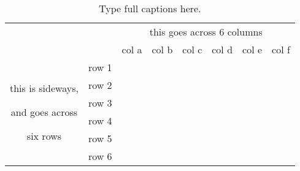 \begin{table}[h!tb]

\centering

\begin{tabular}{cc|rrrrrr}\hline

&&\multicolumn{6}{c}{this goes across 6 columns}\\

 && col a & col b & col c & col d & col e & col f \\ \hline \hline

\multirow{6}{*}{
%
\begin{sideways}
this is sideways,
\end{sideways}
%
\begin{sideways}
and goes across
\end{sideways}
%
\begin{sideways}
six rows
\end{sideways}
%
}

& row 1 \\
& row 2 \\
& row 3 \\
& row 4 \\
& row 5 \\
& row 6 \\ \hline

\end{tabular}

\caption[Short description]{Type full captions here.}
\label{ex2}

\end{table}


